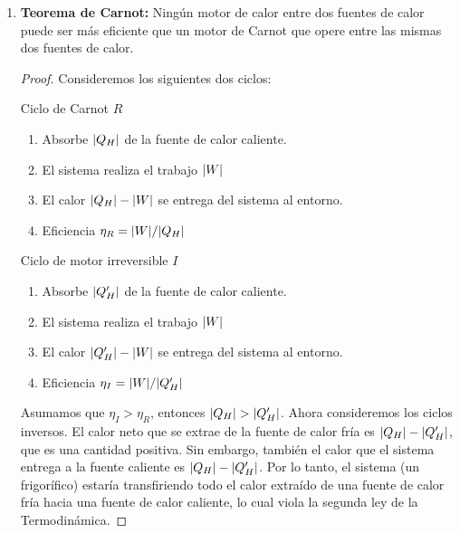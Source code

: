 \begin{itemize}
\begin{enumerate}
\item \textbf{Teorema de Carnot:} Ningún motor de calor entre
dos fuentes de calor puede ser más eficiente que un motor de
Carnot que opere entre las mismas dos fuentes de calor.
\begin{proof}
Consideremos los siguientes dos ciclos:
\begin{multicols}{2}
\setlength{\columnseprule}{0pt}
\centering
Ciclo de Carnot $R$
\begin{enumerate}
\item Absorbe $\abs{Q_H}$ de la fuente de calor caliente.
\item El sistema realiza el trabajo $\abs{W}$
\item El calor $\abs{Q_H}-\abs{W}$ se entrega del sistema al entorno.
\item Eficiencia $\eta_R=\abs{W}/\abs{Q_H}$
\end{enumerate} 
\columnbreak
\centering
Ciclo de motor irreversible $I$
\begin{enumerate}
\item Absorbe $\abs{Q_H'}$ de la fuente de calor caliente.
\item El sistema realiza el trabajo $\abs{W}$
\item El calor $\abs{Q_H'}-\abs{W}$ se entrega del sistema al entorno.
\item Eficiencia $\eta_I=\abs{W}/\abs{Q_H'}$
\end{enumerate}
\end{multicols}
Asumamos que $\eta_I>\eta_R$, entonces $\abs{Q_H}>\abs{Q_H'}$. Ahora 
consideremos los ciclos inversos. El calor neto que se extrae 
de la fuente de calor fría es $\abs{Q_H}-\abs{Q_H'}$, que es una cantidad
positiva. Sin embargo, también el calor que el sistema entrega
a la fuente caliente es $\abs{Q_H}-\abs{Q_H'}$. Por lo tanto, el sistema
(un frigorífico) estaría transfiriendo todo el calor extraído de una 
fuente de calor fría hacia una fuente de calor caliente, lo cual 
viola la segunda ley de la Termodinámica. 
\end{proof}
\end{enumerate}
\end{itemize}


